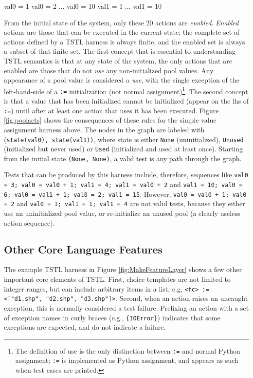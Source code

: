 {\scriptsize
\begin{code}
val0 = 1
val0 = 2 ...
val0 = 10
val1 = 1 ...
val1 = 10
\end{code}
}

From the initial state of the system, only these 20 actions are
\emph{enabled}.  \emph{Enabled} actions are those that can be executed in the
current state; the complete set of actions defined by a TSTL harness is always
finite, and the enabled set is always a subset of that finite set.  The first concept that is essential to understanding
TSTL semantics is that at any state of the
system, the only actions that are enabled are those that do not
\emph{use} any non-initialized pool values.  Any appearance of a pool
value is considered a \emph{use}, with the single exception of the left-hand-side of a
{\tt :=} initialization (not normal assignment)\footnote{The definition of
use is the only distinction between {\tt :=} and normal Python
assignment; {\tt :=} is implemented as Python assignment, and appears
as such when test cases are printed.}.  The second concept is that a
value that has been initialized
cannot be initialized (appear on the lhs of {\tt :=}) until after at
least one action
that uses it has been executed.  Figure \ref{fig:poolacts} shows the
consequences of these rules for the simple value assignment harness
above.  The nodes in the graph are labeled with {(\tt state(val0),
  state(val1))}, where state is
either {\tt None} (uninitialized), {\tt Unused} (initialized
but never used) or {\tt Used} (initialized and used at least once).
Starting from the initial state {\tt (None, None)}, a valid test is any path
through the graph. 

Tests that can be produced by this harness include, therefore,
sequences like  {\tt val0 = 3; val0 = val0 + 1; val1 = 4; val1 = val0
  + 2} and {\tt val1 = 10; val0 = 6; val0 = val1 + 1; val0 = 2; val1 =
  15}.  However, {\tt val0 = val0 + 1; val0 = 2} and
{\tt val0 = 1; val1 = 1; val1 = 4} are not valid tests, because they
either use an uninitialized pool value, or re-initialize an unused
pool (a clearly useless action sequence).

\subsection{Other Core Language Features}

The example TSTL harness in Figure \ref{fig:MakeFeatureLayer} shows a
few other important core elements of TSTL.  First, choice templates
are not limited to integer ranges, but can include arbitrary items in
a list, e.g, {\tt <fc> := <["d1.shp", "d2.shp", "d3.shp"]>}.
Second, when an action raises an uncaught exception, this is normally
considered a test failure.  Prefixing an action with a set of
exception names in curly braces (e.g., {\tt \{IOError\}}) indicates
that some exceptions are expected, and do not indicate a failure.


